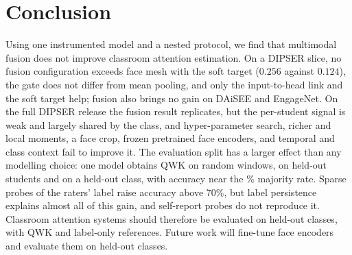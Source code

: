 \section{Conclusion}
\label{sec:conclusion}

Using one instrumented model and a nested protocol, we find that multimodal fusion does not improve classroom attention estimation. On a DIPSER slice, no fusion configuration exceeds face mesh with the soft target ($0.256$ against $0.124$), the gate does not differ from mean pooling, and only the input-to-head link and the soft target help; fusion also brings no gain on DAiSEE and EngageNet. On the full DIPSER release the fusion result replicates, but the per-student signal is weak and largely shared by the class, and hyper-parameter search, richer and local moments, a face crop, frozen pretrained face encoders, and temporal and class context fail to improve it. The evaluation split has a larger effect than any modelling choice: one model obtains QWK \fcLeakRandQWK{} on random windows, \fcLeakPersonQWK{} on held-out students and \fcLogoOwnQWK{} on a held-out class, with accuracy near the \fcMajority\% majority rate. Sparse probes of the raters' label raise accuracy above 70\%, but label persistence explains almost all of this gain, and self-report probes do not reproduce it. Classroom attention systems should therefore be evaluated on held-out classes, with QWK and label-only references. Future work will fine-tune face encoders and evaluate them on held-out classes.
